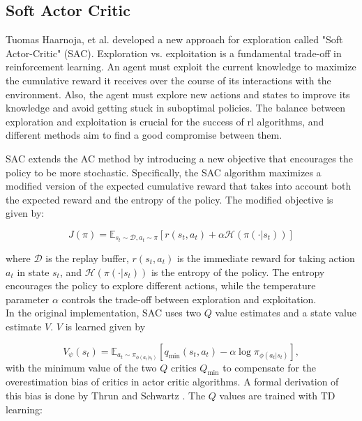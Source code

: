 \subsection{Soft Actor Critic}
\label{SAC}
Tuomas Haarnoja, et al. \cite{haarnoja2018soft} developed a new approach for exploration called "Soft Actor-Critic" (SAC). Exploration vs. exploitation 
is a fundamental trade-off in reinforcement learning. An agent must exploit the current knowledge to maximize the cumulative reward it receives 
over the course of its interactions with the environment. Also, the agent must explore new actions and states to improve its knowledge and avoid getting stuck in suboptimal policies. 
The balance between exploration and exploitation is crucial for the success of \ac{rl} algorithms, and different methods aim to find a good compromise between them.

SAC extends the AC method by introducing a new objective that encourages the policy to be more stochastic. Specifically, the SAC algorithm maximizes a modified 
version of the expected cumulative reward that takes into account both the expected reward and the entropy of the policy. The modified objective is given by:

\begin{equation}
J(\pi) = \mathbb{E}_{s_t \sim \mathcal{D}, a_t \sim \pi}[r(s_t, a_t) + \alpha \mathcal{H}(\pi(\cdot|s_t))]
\end{equation}

where $\mathcal{D}$ is the replay buffer, $r(s_t, a_t)$ is the immediate reward for taking action $a_t$ in state $s_t$, and $\mathcal{H}(\pi(\cdot|s_t))$ is the entropy of the policy. The entropy 
encourages the policy to explore different actions, while the temperature parameter $\alpha$ controls the trade-off between exploration and exploitation.\\

In the original implementation, SAC uses two $Q$ value estimates and a state value estimate $V$. $V$ is learned given by 

\begin{equation}
    V_{\psi}(s_t) = \mathbb{E}_{a_t \sim \pi_{\phi(a_t|s_t)}}[q_\text{min}(s_t, a_t) - \alpha \log \pi_{\phi(a_t|s_t)}],
\end{equation}
with the minimum value of the two $Q$ critics $Q_\text{min}$ to compensate for the overestimation bias of critics in actor critic 
algorithms. A formal derivation of this bias is done by Thrun and Schwartz \cite{thrun1993issues}. 
The $Q$ values are trained with TD learning:

